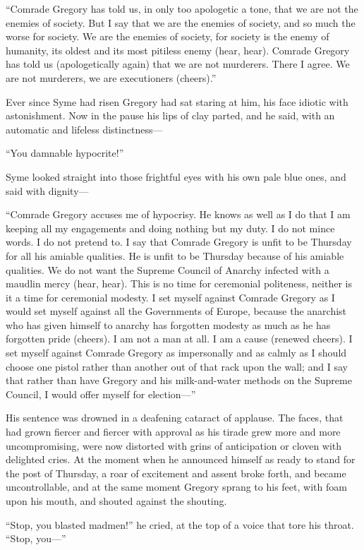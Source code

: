 “Comrade Gregory has told us, in only too apologetic a tone, that we are not the enemies of society. But I say that we are the enemies of society, and so much the worse for society. We are the enemies of society, for society is the enemy of humanity, its oldest and its most pitiless enemy (hear, hear). Comrade Gregory has told us (apologetically again) that we are not murderers. There I agree. We are not murderers, we are executioners (cheers).”

Ever since Syme had risen Gregory had sat staring at him, his face idiotic with astonishment. Now in the pause his lips of clay parted, and he said, with an automatic and lifeless distinctness⁠—

“You damnable hypocrite!”

Syme looked straight into those frightful eyes with his own pale blue ones, and said with dignity⁠—

“Comrade Gregory accuses me of hypocrisy. He knows as well as I do that I am keeping all my engagements and doing nothing but my duty. I do not mince words. I do not pretend to. I say that Comrade Gregory is unfit to be Thursday for all his amiable qualities. He is unfit to be Thursday because of his amiable qualities. We do not want the Supreme Council of Anarchy infected with a maudlin mercy (hear, hear). This is no time for ceremonial politeness, neither is it a time for ceremonial modesty. I set myself against Comrade Gregory as I would set myself against all the Governments of Europe, because the anarchist who has given himself to anarchy has forgotten modesty as much as he has forgotten pride (cheers). I am not a man at all. I am a cause (renewed cheers). I set myself against Comrade Gregory as impersonally and as calmly as I should choose one pistol rather than another out of that rack upon the wall; and I say that rather than have Gregory and his milk-and-water methods on the Supreme Council, I would offer myself for election⁠—”

His sentence was drowned in a deafening cataract of applause. The faces, that had grown fiercer and fiercer with approval as his tirade grew more and more uncompromising, were now distorted with grins of anticipation or cloven with delighted cries. At the moment when he announced himself as ready to stand for the post of Thursday, a roar of excitement and assent broke forth, and became uncontrollable, and at the same moment Gregory sprang to his feet, with foam upon his mouth, and shouted against the shouting.

“Stop, you blasted madmen!” he cried, at the top of a voice that tore his throat. “Stop, you⁠—”

